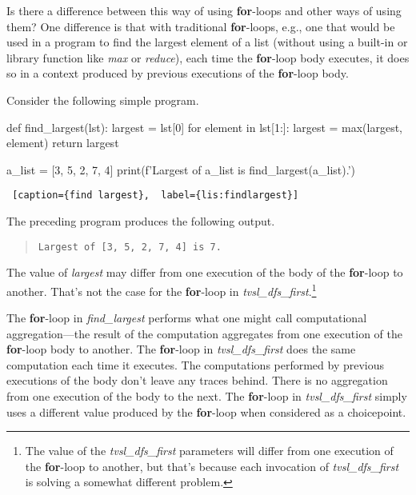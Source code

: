 Is there a difference between this way of using \textbf{for}-loops and other ways of using them? One difference is that with traditional \textbf{for}-loops, e.g., one that would be used in a program to find the largest element of a list (without using a built-in or library function like \textit{max} or \textit{reduce}), each time the \textbf{for}-loop body executes, it does so in a context produced by previous executions of the \textbf{for}-loop body. 

Consider the following simple program.

\begin{minipage}{\linewidth}  \largev   \hrulefill
\begin{python}
def find_largest(lst):
    largest = lst[0]
    for element in lst[1:]:
        largest = max(largest, element)
    return largest

a_list = [3, 5, 2, 7, 4]
print(f'Largest of {a_list} is {find_largest(a_list)}.')
\end{python}
\begin{lstlisting} [caption={find largest},  label={lis:findlargest}]
\end{lstlisting}
\end{minipage}

The preceding program produces the following output.
\begin{quote}
\begin{verbatim}
Largest of [3, 5, 2, 7, 4] is 7.
\end{verbatim}
\end{quote}

The value of \textit{largest} may differ from one execution of the body of the \textbf{for}-loop to another. That's not the case for the \textbf{for}-loop in \textit{tvsl\_dfs\_first}.\footnote{The value of the \textit{tvsl\_dfs\_first} parameters will differ from one execution of the \textbf{for}-loop to another, but that's because each invocation of \textit{tvsl\_dfs\_first} is solving a somewhat different problem.} 

The \textbf{for}-loop in \textit{find\_largest} performs what one might call computational aggregation---the result of the computation aggregates from one execution of the \textbf{for}-loop body to another. The \textbf{for}-loop in \textit{tvsl\_dfs\_first} does the same computation each time it executes. The computations performed by previous executions of the body don't leave any traces behind. There is no aggregation from one execution of the body to the next. The \textbf{for}-loop in \textit{tvsl\_dfs\_first} simply uses a different value produced by the \textbf{for}-loop when considered as a choicepoint. 

